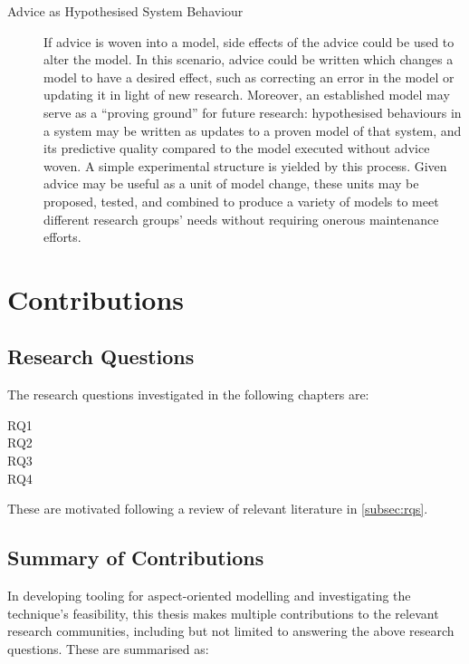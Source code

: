 \begin{description}
  \item[Advice as Hypothesised System Behaviour] If advice is woven into a
  model, side effects of the advice could be used to alter the model. In this
  scenario, advice could be written which changes a model to have a desired
  effect, such as correcting an error in the model or updating it in light of
  new research. Moreover, an established model may serve as a ``proving ground''
  for future research: hypothesised behaviours in a system may be written as
  updates to a proven model of that system, and its predictive quality compared
  to the model executed without advice woven. A simple experimental structure is
  yielded by this process. Given advice may be useful as a unit of model change,
  these units may be proposed, tested, and combined to produce a variety of
  models to meet different research groups' needs without requiring onerous
  maintenance efforts.
\end{description}




\section{Contributions}
\label{intro_contributions}

\subsection{Research Questions}

The research questions investigated in the following chapters are: 

\begin{researchquestion}
\begin{description}
\item[RQ1] \rqone{}
\item[RQ2] \rqtwo{}
\item[RQ3] \rqthree{}
\item[RQ4] \rqfour{}
\end{description}
\end{researchquestion}

These are motivated following a review of relevant literature in \cref{subsec:rqs}.

\subsection{Summary of Contributions}

In developing tooling for aspect-oriented modelling and investigating the
technique's feasibility, this thesis makes multiple contributions to the
relevant research communities, including but not limited to answering the above
research questions. These are summarised as:


